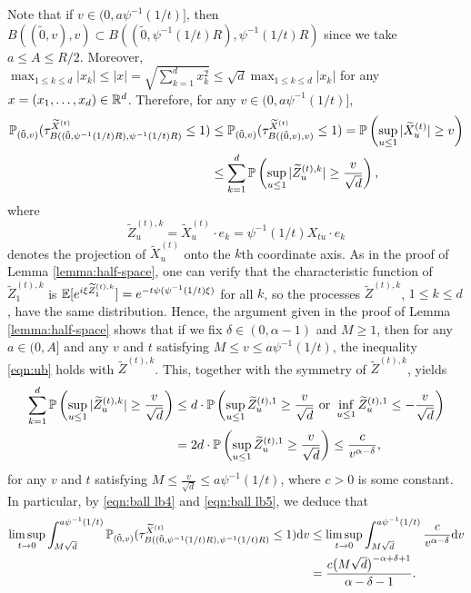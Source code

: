 \documentclass[11pt]{article}
\begin{document}
\begin{doublespace}
Note that if $v\in (0, a\psi^{-1}(1/t)]$, then $B((\tilde{0}, v),v)\subset B((\tilde{0},\psi^{-1}(1/t)R),\psi^{-1}(1/t)R)$ since we take $a\le A\le R/2$. 
Moreover, $\max_{1\leq k\leq d}|x_k|\leq |x|=\sqrt{\sum_{k=1}^{d}x_k^2}\leq \sqrt{d}\max_{1\leq k\leq d}|x_k|$ for any $x=(x_1,\ldots, x_d)\in \R^{d}$.
Therefore, for any $v\in (0, a\psi^{-1}(1/t)]$, 
\begin{align}\label{eqn:ball lb4}
\P_{(\tilde{0},v)}(\tau_{B((\tilde{0},\psi^{-1}(1/t)R),\psi^{-1}(1/t)R)}^{\widetilde{X}^{(t)}} \leq 1)
&\leq \P_{(\tilde{0},v)}(\tau_{B((\tilde{0},v),v)}^{\widetilde{X}^{(t)}} \leq 1)\notag 
=\P\left(\sup_{u\leq 1}|\widetilde{X}_{u}^{(t)}|\geq v\right)\\
&\leq\sum_{k=1}^{d}\P\left(\sup_{u\leq 1}|\widetilde{Z}_{u}^{(t),k}|\geq \frac{v}{\sqrt{d}}\right), 
\end{align}
where 
\[
\widetilde{Z}_{u}^{(t),k}=\widetilde{X}_{u}^{(t)}\cdot e_{k}=\psi^{-1}(1/t)X_{tu}\cdot e_{k}
\]
denotes the projection of $\widetilde{X}_{u}^{(t)}$ onto the $k$th coordinate axis.
As in the proof of  Lemma \ref{lemma:half-space}, one can verify that the characteristic function of $\widetilde{Z}_{1}^{(t),k}$ is $\E[e^{i\xi\widetilde{Z}_{1}^{(t),k}}]=e^{-t\psi(\psi^{-1}(1/t)\xi)}$ for all $k$, so the processes $\widetilde{Z}^{(t),k}$, $1\le k\le d$, have the same distribution. 
Hence, the argument given in the proof of Lemma \ref{lemma:half-space} shows that if we fix $\delta\in(0,\alpha-1)$ and $M\ge 1$, then for any $a\in (0,A]$ and any $v$ and $t$ satisfying $M\leq v\leq a\psi^{-1}(1/t)$, the inequality \eqref{eqn:ub} holds with $\widetilde{Z}^{(t),k}$.
This, together with the symmetry of $\widetilde{Z}^{(t),k}$, yields  
\begin{align}\label{eqn:ball lb5}
\sum_{k=1}^{d}\P\left(\sup_{u\leq 1}|\widetilde{Z}_{u}^{(t),k}|\geq \frac{v}{\sqrt{d}}\right)
&\leq d\cdot \P\left(\sup_{u\leq 1}\widetilde{Z}_{u}^{(t),1}\geq \frac{v}{\sqrt{d}} \text{ or } \inf_{u\leq 1}\widetilde{Z}_{u}^{(t),1}\leq -\frac{v}{\sqrt{d}}\right) \notag\\
&=2d\cdot \P\left(\sup_{u\leq 1}\widetilde{Z}_{u}^{(t),1}\geq \frac{v}{\sqrt{d}}\right)
\leq \frac{c}{v^{\alpha-\delta}},
\end{align}
for any $v$ and $t$ satisfying $M \leq \frac{v}{\sqrt{d}}\leq a\psi^{-1}(1/t)$, where $c>0$ is some constant. 
In particular, by \eqref{eqn:ball lb4} and \eqref{eqn:ball lb5}, we deduce that 
\begin{align}\label{eqn:ball lb6}
	\limsup_{t\to0}\int_{M\sqrt{d}}^{a\psi^{-1}(1/t)}\P_{(\tilde{0},v)}(\tau_{B((\tilde{0},\psi^{-1}(1/t)R),\psi^{-1}(1/t)R)}^{\widetilde{X}^{(t)}} \leq 1)\ud v
	&\le \limsup_{t\to0}\int_{M\sqrt{d}}^{a\psi^{-1}(1/t)}\frac{c}{v^{\alpha-\delta}}\ud v \notag\\
	&=\frac{c\bigl(M\sqrt{d}\bigr)^{-\alpha+\delta+1}}{\alpha-\delta-1}.
\end{align}



\end{doublespace}
\end{document}
